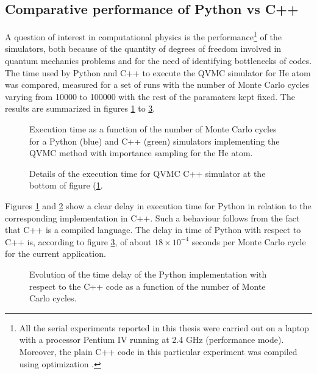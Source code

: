 \subsection{Comparative performance of Python vs C++}
A question of interest in computational physics is the performance\footnote{All the serial experiments reported in this thesis were carried out on a laptop with a processor Pentium IV running at 2.4 GHz (performance mode). Moreover, the plain C++ code in this particular experiment was compiled using optimization .} of the simulators, both because of the quantity of degrees of freedom involved in quantum mechanics problems and for the need of identifying bottlenecks of codes. The time used by Python and C++ to execute the QVMC simulator for He atom was compared, measured for a set of runs with the number of Monte Carlo cycles varying from 10000 to 100000 with the rest of the paramaters kept fixed. The results are summarized in figures \ref{executionTimeHePyCpp} to \ref{delayExecutionTimeHePyCpp}. \\

\begin{figure}
\centering
\scalebox{0.75}{}
\caption{Execution time as a function of the number of Monte Carlo cycles for a Python (blue) and C++ (green) simulators implementing the QVMC method with importance sampling for the He atom.}
\label{executionTimeHePyCpp}
\end{figure}


\begin{figure}
\centering
\scalebox{0.75}{}
\caption{Details of the execution time for QVMC C++ simulator at the bottom of figure (\ref{executionTimeHePyCpp}.}
\label{detailsExecutionTimeHeCpp}
\end{figure}

\noindent
Figures \ref{executionTimeHePyCpp} and \ref{detailsExecutionTimeHeCpp} show a clear delay in execution time for Python in relation to the corresponding implementation in C++. Such a behaviour follows from the fact that C++ is a compiled language. The delay in time of Python with respect to C++ is, according to figure \ref{delayExecutionTimeHePyCpp}, of about $18\times10^{-4}$ seconds per Monte Carlo cycle for the current application.

\begin{figure}
\centering
\scalebox{0.75}{}
\caption{Evolution of the time delay of the Python implementation with respect to the C++ code as a function of the number of Monte Carlo cycles.}
\label{delayExecutionTimeHePyCpp}
\end{figure}

